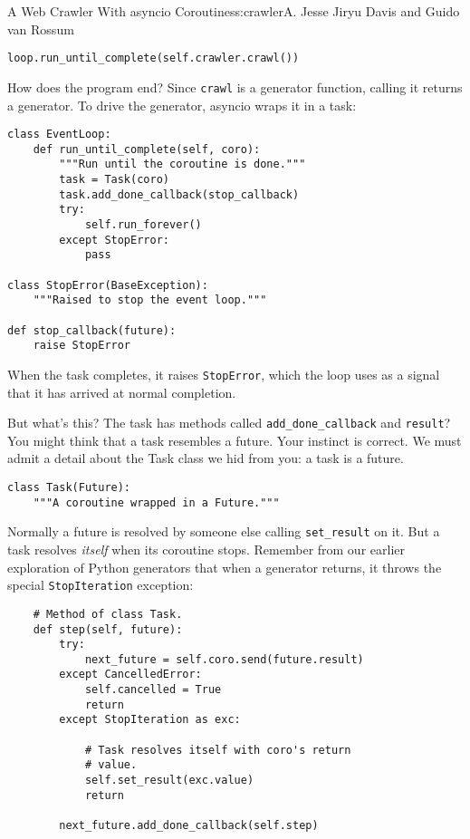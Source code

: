 \begin{aosachapter}{A Web Crawler With asyncio Coroutines}{s:crawler}{A. Jesse Jiryu Davis and Guido van Rossum}
\begin{verbatim}
loop.run_until_complete(self.crawler.crawl())
\end{verbatim}

How does the program end? Since \texttt{crawl} is a generator function,
calling it returns a generator. To drive the generator, asyncio wraps it
in a task:

\begin{verbatim}
class EventLoop:
    def run_until_complete(self, coro):
        """Run until the coroutine is done."""
        task = Task(coro)
        task.add_done_callback(stop_callback)
        try:
            self.run_forever()
        except StopError:
            pass

class StopError(BaseException):
    """Raised to stop the event loop."""

def stop_callback(future):
    raise StopError
\end{verbatim}

When the task completes, it raises \texttt{StopError}, which the loop
uses as a signal that it has arrived at normal completion.

But what's this? The task has methods called
\texttt{add\_done\_callback} and \texttt{result}? You might think that a
task resembles a future. Your instinct is correct. We must admit a
detail about the Task class we hid from you: a task is a future.

\begin{verbatim}
class Task(Future):
    """A coroutine wrapped in a Future."""
\end{verbatim}

Normally a future is resolved by someone else calling
\texttt{set\_result} on it. But a task resolves \emph{itself} when its
coroutine stops. Remember from our earlier exploration of Python
generators that when a generator returns, it throws the special
\texttt{StopIteration} exception:

\begin{verbatim}
    # Method of class Task.
    def step(self, future):
        try:
            next_future = self.coro.send(future.result)
        except CancelledError:
            self.cancelled = True
            return
        except StopIteration as exc:

            # Task resolves itself with coro's return
            # value.
            self.set_result(exc.value)
            return

        next_future.add_done_callback(self.step)
\end{verbatim}


\end{aosachapter}
